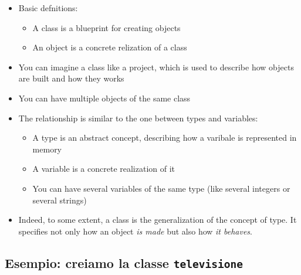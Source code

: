   \begin{itemize}
  \item Basic defnitions:
    \begin{itemize}
    \item A \alert{class} is a blueprint for creating objects
    \item An \alert{object} is a concrete relization of a class
    \end{itemize}

  \smallskip
  
  \item You can imagine a class like a project, which is used to
        describe how objects are built and how they works

  \smallskip

  \item You can have multiple objects of the same class
  
  \smallskip
  
  \item The relationship is similar to the one between types and variables:
    \begin{itemize} 
    \item A type is an abstract concept, describing how a varibale is
          represented in memory
    \item A variable is a concrete realization of it
    \item You can have several variables of the same type (like several integers
          or several strings)
    \end{itemize}
  
  \smallskip
  
  \item Indeed, to some extent, a class is the generalization of the concept of
        type. It specifies not only how an object \emph{is made} but also how \emph{it behaves}.
  \end{itemize}

\subsection{Esempio: creiamo la classe \texttt{televisione}
}

